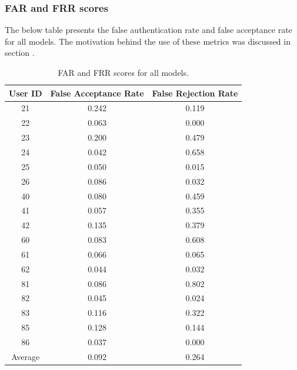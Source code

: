 
\subsubsection{FAR and FRR scores}
The below table presents the false authentication rate and false acceptance rate for all models. The motivation behind the use of these metrics was discussed in section .

\begin{center}
\begin{table}[H]
\begin{center}
	\begin{tabular}{ |c|c|c| } 
		\hline
		User ID & False Acceptance Rate & False Rejection Rate \\
		\hline
		21 & 0.242 & 0.119 \\
		\hline
		22 & 0.063 & 0.000 \\
		\hline
		23 & 0.200 & 0.479 \\
		\hline
		24 & 0.042 & 0.658 \\
		\hline
		25 & 0.050 & 0.015 \\
		\hline
		26 & 0.086 & 0.032 \\
		\hline
		40 & 0.080 & 0.459 \\
		\hline
		41 & 0.057 & 0.355 \\
		\hline
		42 & 0.135 & 0.379 \\
		\hline
		60 & 0.083 & 0.608 \\
		\hline
		61 & 0.066 & 0.065 \\
		\hline
		62 & 0.044 & 0.032 \\
		\hline
		81 & 0.086 & 0.802 \\
		\hline
		82 & 0.045 & 0.024 \\
		\hline
		83 & 0.116 & 0.322 \\
		\hline
		85 & 0.128 & 0.144 \\
		\hline
		86 & 0.037 & 0.000 \\
		\hline
		\hline
		Average & 0.092 & 0.264 \\
		\hline
	\end{tabular}
\end{center}
\caption{FAR and FRR scores for all models.}
\label{table:FAR_FRR_base}
\end{table}
\end{center}

